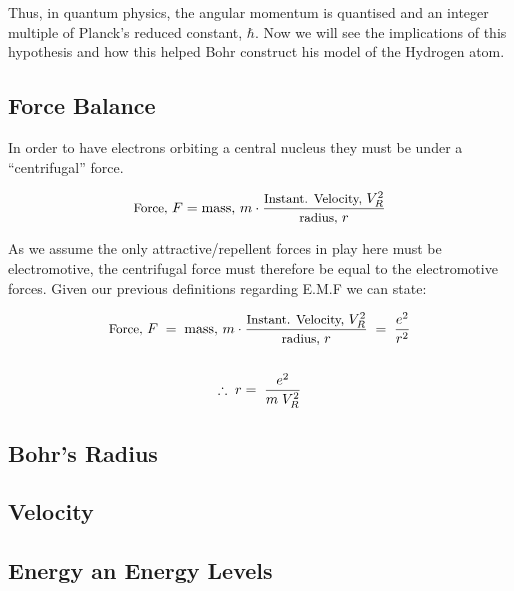 \documentclass[colorlinks,11pt,a4paper,normalphoto,withhyper,ragged2e]{altareport}
\begin{document}
		\vspace{5mm}
		
		Thus, in quantum physics, the angular momentum is quantised and an integer multiple of Planck's reduced constant, $\hbar$. Now we will see the implications of this hypothesis and how this helped Bohr construct his model of the Hydrogen atom. \linebreak
		
		
	\subsection{Force Balance}
		In order to have electrons orbiting a central nucleus they must be under a ``centrifugal'' force. \linebreak
		
		\begin{equation*}
			\text{\small Force, }F = \text{mass, }m \cdot \frac{\text{\small Instant. Velocity, }V_R^2}{\text{\small radius, }r}
		\end{equation*}
		
		\vspace{5mm}
		
		As we assume the only attractive/repellent forces in play here must be electromotive, the centrifugal force must therefore be equal to the electromotive forces. Given our previous definitions regarding E.M.F we can state: \linebreak
		
		\begin{gather*}
			\text{\small Force, }F \; = \; \text{mass, }m \cdot \frac{\text{\small Instant. Velocity, }V_R^2}{\text{\small radius, }r} \; = \; \frac{e^2}{r^2} \\
			\\
			\therefore \;  r = \; \frac{e^2}{m \; V_R^2}
		\end{gather*}
		
		
		
		
	\subsection{Bohr’s Radius}
		
		
	\subsection{Velocity}
	
	
	\subsection{Energy an Energy Levels}
	
\end{document}
